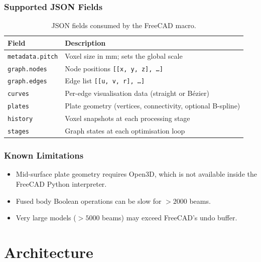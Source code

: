 \documentclass[a4paper, 11pt, openany]{report}
\begin{document}
\subsection{Supported JSON Fields}

\begin{table}[htbp]
\caption{JSON fields consumed by the FreeCAD macro.}
\label{tab:freecad-json}
\centering
\begin{tabularx}{\textwidth}{lX}
\toprule
Field & Description \\
\midrule
\texttt{metadata.pitch} & Voxel size in mm; sets the global scale \\
\texttt{graph.nodes} & Node positions \texttt{[[x, y, z], \ldots]} \\
\texttt{graph.edges} & Edge list \texttt{[[u, v, r], \ldots]} \\
\texttt{curves} & Per-edge visualisation data (straight or B\'ezier) \\
\texttt{plates} & Plate geometry (vertices, connectivity, optional B-spline) \\
\texttt{history} & Voxel snapshots at each processing stage \\
\texttt{stages} & Graph states at each optimisation loop \\
\bottomrule
\end{tabularx}
\end{table}

\subsection{Known Limitations}

\begin{itemize}[nosep]
    \item Mid-surface plate geometry requires Open3D, which is not available
          inside the FreeCAD Python interpreter.
    \item Fused body Boolean operations can be slow for $> 2000$ beams.
    \item Very large models ($> 5000$ beams) may exceed FreeCAD's undo buffer.
\end{itemize}


\chapter{Architecture}
\label{ch:architecture}
\end{document}
